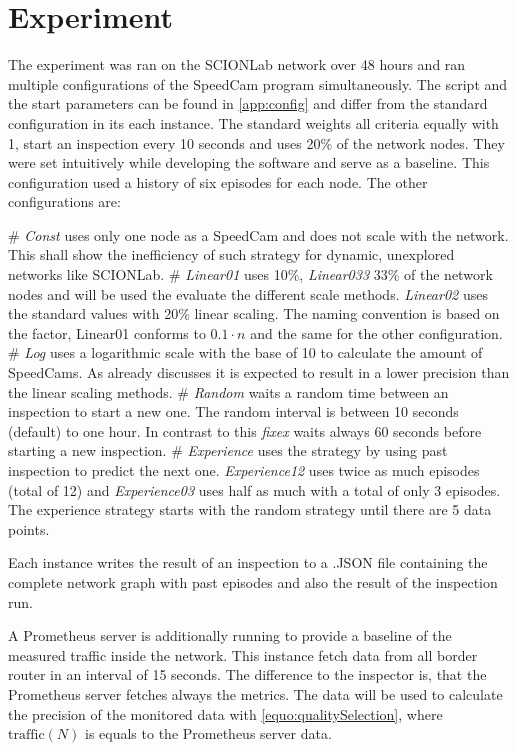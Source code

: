 \documentclass[thesis.tex]{subfiles}
\begin{document}
\section{Experiment}

The experiment was ran on the SCIONLab network over 48 hours and ran multiple configurations of the SpeedCam program simultaneously. The script and the start parameters can be found in \autoref{app:config} and differ from the standard configuration in its each instance. The standard weights all criteria equally with 1, start an inspection every 10 seconds and uses 20\% of the network nodes. They were set intuitively while developing the software and serve as a baseline. This configuration used a history of six episodes for each node. The other configurations are:

\begin{easylist}
	# \textit{Const} uses only one node as a SpeedCam and does not scale with the network. This shall show the inefficiency of such strategy for dynamic, unexplored networks like SCIONLab.
	# \textit{Linear01} uses 10\%, \textit{Linear033} 33\% of the network nodes and will be used the evaluate the different scale methods. \textit{Linear02} uses the standard values with 20\% linear scaling. The naming convention is based on the factor, Linear01 conforms to $0.1 \cdot n$ and the same for the other configuration.
	# \textit{Log} uses a logarithmic scale with the base of 10 to calculate the amount of SpeedCams. As already discusses it is expected to result in a lower precision than the linear scaling methods.
	# \textit{Random} waits a random time between an inspection to start a new one. The random interval is between 10 seconds (default) to one hour. In contrast to this \textit{fixex} waits always 60 seconds before starting a new inspection.
	# \textit{Experience} uses the strategy by using past inspection to predict the next one. \textit{Experience12} uses twice as much episodes (total of 12) and \textit{Experience03} uses half as much with a total of only 3 episodes. The experience strategy starts with the random strategy until there are 5 data points.		
\end{easylist}

Each instance writes the result of an inspection to a .JSON file containing the complete network graph with past episodes and also the result of the inspection run. 

A Prometheus server is additionally running to provide a baseline of the measured traffic inside the network. This instance fetch data from all border router in an interval of 15 seconds. The difference to the inspector is, that the Prometheus server fetches always the metrics. The data will be used to calculate the precision of the monitored data with \autoref{equo:qualitySelection}, where $\text{traffic}(N)$ is equals to the Prometheus server data. 
\end{document}
